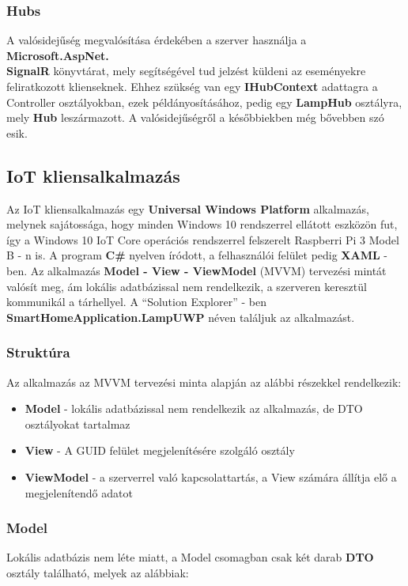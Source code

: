 \documentclass[a4paper,12pt]{report}
\begin{document}
\subsubsection{Hubs}
    A valósidejűség megvalósítása érdekében a szerver használja a \textbf{Microsoft.AspNet.\\SignalR} könyvtárat, mely segítségével
    tud jelzést küldeni az eseményekre feliratkozott klienseknek. Ehhez szükség van egy \textbf{IHubContext} adattagra a Controller
    osztályokban, ezek példányosításához, pedig egy \textbf{LampHub} osztályra, mely \textbf{Hub} leszármazott. A valósidejűségről
    a későbbiekben még bővebben szó esik.

\subsection{IoT kliensalkalmazás}
    Az IoT kliensalkalmazás egy \textbf{Universal Windows Platform} alkalmazás, melynek sajátossága, hogy minden Windows 10 rendszerrel
    ellátott eszközön fut, így a Windows 10 IoT Core operációs rendszerrel felszerelt Raspberri Pi 3 Model B - n is. A program \textbf{C\#} nyelven
    íródott, a felhasználói felület pedig \textbf{XAML} - ben. Az alkalmazás \textbf{Model - View - ViewModel} (MVVM) tervezési mintát
    valósít meg, ám lokális adatbázissal nem rendelkezik, a szerveren keresztül kommunikál a tárhellyel. A ``Solution Explorer'' - ben
    \textbf{SmartHomeApplication.LampUWP} néven találjuk az alkalmazást.

\subsubsection{Struktúra}
    Az alkalmazás az MVVM tervezési minta alapján az alábbi részekkel rendelkezik:

\begin{itemize}
    \item \textbf{Model} - lokális adatbázissal nem rendelkezik az alkalmazás, de DTO osztályokat tartalmaz
    \item \textbf{View} - A GUID felület megjelenítésére szolgáló osztály
    \item \textbf{ViewModel} - a szerverrel való kapcsolattartás, a View számára állítja elő a megjelenítendő adatot
\end{itemize}

\subsubsection{Model}
    Lokális adatbázis nem léte miatt, a Model csomagban csak két darab \textbf{DTO} osztály található, melyek az alábbiak:
\end{document}
